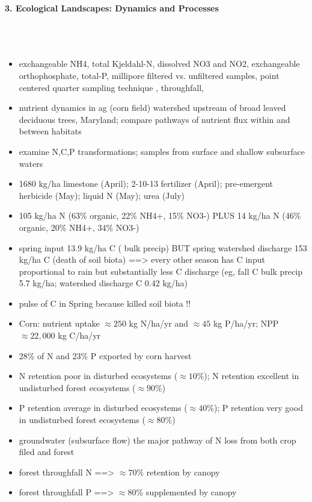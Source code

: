 \documentclass[12pt]{article}
\begin{document}
\textbf{ 3. Ecological Landscapes: Dynamics and Processes}\\
 \cite{turner_disturbance_2010}\\
 \cite{turner_landscape_1989}\\
 \cite{peterjohn_nutrient_1984}\\
\begin{itemize}
	\item exchangeable NH4, total Kjeldahl-N, dissolved NO3 and NO2, exchangeable orthophosphate, total-P, millipore filtered vs. unfiltered samples, point centered quarter sampling technique \cite{mitchell_quantitative_2010}, throughfall, 
	\item nutrient dynamics in ag (corn field) watershed upstream of broad leaved deciduous trees, Maryland; compare pathways of nutrient flux within and between habitats
	\item examine N,C,P transformations; samples from surface and shallow subsurface waters
	\item 1680 kg/ha limestone (April); 2-10-13 fertilizer (April); pre-emergent herbicide (May); liquid N (May); urea (July)
	\item 105 kg/ha N (63\% organic, 22\% NH4+, 15\% NO3-) PLUS 14 kg/ha N (46\% organic, 20\% NH4+, 34\% NO3-)
	\item spring input 13.9 kg/ha C ( bulk precip) BUT spring watershed discharge 153 kg/ha C (death of soil biota) ==> every other season has C input proportional to rain but substantially less C discharge (eg, fall C bulk precip 5.7 kg/ha; watershed discharge C 0.42 kg/ha)
	\item pulse of C in Spring because killed soil biota !!
	\item Corn: nutrient uptake $\approx  250$ kg N/ha/yr and $\approx 45$ kg P/ha/yr; NPP $\approx  22,000$ kg C/ha/yr
	\item 28\% of N  and 23\% P exported by corn harvest
	\item N retention poor in disturbed ecosystems ($\approx 10\%$); N retention excellent in undisturbed forest ecosystems ($\approx 90\%$)
	\item P retention average in disturbed ecosystems ($\approx 40\%$); P retention very good in undisturbed forest ecosystems ($\approx 80\%$)
	\item groundwater (subsurface flow)  the major pathway of N loss from both crop filed and forest
	\item forest throughfall N ==> $\approx 70\%$ retention by canopy
	\item forest throughfall P ==> $\approx 80\%$ supplemented by canopy

\end{itemize}
\end{document}
